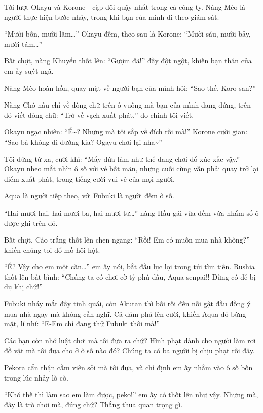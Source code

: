 \documentclass[../main.tex]{subfiles}
\begin{document}
Tới lượt Okayu và Korone - cặp đôi quậy nhất trong cả công ty. Nàng Mèo là người thực hiện bước nhảy, trong khi bạn của mình đi theo giám sát.

``Mười bốn, mười lăm\dots'' Okayu đếm, theo sau là Korone: ``Mười sáu, mười bảy, mười tám\dots''

Bất chợt, nàng Khuyển thốt lên: ``Gượm đã!'' đầy đột ngột, khiến bạn thân của em ấy suýt ngã.

Nàng Mèo hoàn hồn, quay mặt về người bạn của mình hỏi: ``Sao thế, Koro-san?''

Nàng Chó nâu chỉ về dòng chữ trên ô vuông mà bạn của mình đang đứng, trên đó viết dòng chữ: ``Trở về vạch xuất phát,'' do chính tôi viết.

Okayu ngạc nhiên: ``Ể\~{}? Nhưng mà tôi sắp về đích rồi mà!'' Korone cười gian: ``Sao bà không đi đường kia? Ogayu chơi lại nha\~{}''

Tôi đứng từ xa, cười khì: ``Mấy đứa làm như thể đang chơi đổ xúc xắc vậy.'' Okayu nheo mắt nhìn ô số với vẻ bất mãn, nhưng cuối cùng vẫn phải quay trở lại điểm xuất phát, trong tiếng cười vui vẻ của mọi người.

\ct

Aqua là người tiếp theo, với Fubuki là người đếm ô số.

``Hai mươi hai, hai mươi ba, hai mươi tư\dots'' nàng Hầu gái vừa đếm vừa nhẩm số ô được ghi trên đó.

Bất chợt, Cáo trắng thốt lên chen ngang: ``Rồi! Em có muốn mua nhà không?'' khiến chúng toi đổ mồ hôi hột.

``Ể? Vậy cho em một căn\dots'' em ấy nói, bắt đầu lục lọi trong túi tìm tiền. Rushia thốt lên bất bình: ``Chúng ta có chơi cờ tỷ phú đâu, Aqua-senpai!! Đừng có dễ bị dụ khị chứ!''

Fubuki nháy mắt đầy tinh quái, còn Akutan thì bối rối đến nỗi gật đầu đồng ý mua nhà ngay mà không cần nghĩ. Cả đám phá lên cười, khiến Aqua đỏ bừng mặt, lí nhí: ``E-Em chỉ đang thử Fubuki thôi mà!''

\il

Các bạn còn nhớ luật chơi mà tôi đưa ra chứ? Hình phạt dành cho người làm rơi đồ vật mà tôi đưa cho ở ô số nào đó? Chúng ta có ba người bị chịu phạt rồi đây.

\il

Pekora cẩn thận cầm viên sỏi mà tôi đưa, và chỉ định em ấy nhắm vào ô số bốn trong lúc nhảy lò cò.

``Khó thế thì làm sao em làm được, peko!'' em ấy có thốt lên như vậy. Nhưng mà, đây là trò chơi mà, đúng chứ? Thắng thua quan trọng gì.
\end{document}
